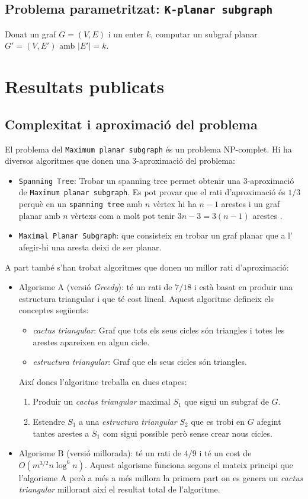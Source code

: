 \documentclass[a4paper]{article}
\begin{document}
\subsection{Problema parametritzat: \texttt{K-planar subgraph}}
Donat un graf $G=(V,E)$ i un enter $k$, computar un subgraf planar $G'=(V,E')$ amb $|E'|=k$.

\section{Resultats publicats}

\subsection{Complexitat i aproximació del problema}
El problema del \texttt{Maximum planar subgraph} és un problema NP-complet. Hi ha diversos algoritmes que donen una 3-aproximació del problema\cite{betterApproximation}:
\begin{itemize}
	\item \texttt{Spanning Tree}: Trobar un spanning tree permet obtenir una 3-aproximació de \texttt{Maximum planar subgraph}. Es pot provar que el rati d'aproximació és $1/3$ perquè en un \texttt{spanning tree} amb $n$ vèrtex hi ha $n - 1$ arestes i un graf planar amb $n$ vèrtexs com a molt pot tenir $3n - 3 = 3(n - 1)$ arestes \cite{planar}.
	\item \texttt{Maximal Planar Subgraph}: que consisteix en trobar un graf planar que a l' afegir-hi una aresta deixi de ser planar.	
\end{itemize}

A part també s'han trobat algoritmes que donen un millor rati d'aproximació:
\begin{itemize}
	\item Algorisme A (versió \emph{Greedy}): té un rati de $7/18$ i està basat en produir una estructura triangular i que té cost lineal. Aquest algoritme defineix els conceptes següents:
	\begin{itemize}
		\item \emph{cactus triangular}: Graf que tots els seus cicles són triangles i totes les arestes apareixen en algun cicle.
		\item \emph{estructura triangular}: Graf que els seus cicles són triangles.
	\end{itemize}
	Així doncs l'algoritme treballa en dues etapes:
	\begin{enumerate}
		\item Produir un \emph{cactus triangular} maximal $S_1$ que sigui un subgraf de $G$.
		\item Estendre $S_1$ a una \emph{estructura triangular} $S_2$ que es trobi en $G$ afegint tantes arestes a $S_1$ com sigui possible però sense crear nous cicles.
	\end{enumerate}
	\item Algorisme B (versió millorada): té un rati de $4/9$ i té un cost de $O(m^{3/2}n\log^6 n)$. Aquest algorisme funciona segons el mateix principi que l'algorisme A però a més a més millora la primera part on es genera un \emph{cactus triangular} millorant així el resultat total de l'algoritme. 
\end{itemize}
\end{document}
